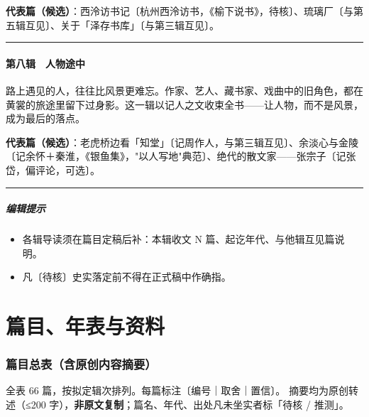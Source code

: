 \documentclass[UTF8,fontset=none,zihao=-4,a4paper]{ctexart}
\begin{document}
\textbf{代表篇（候选）}：西泠访书记〔杭州西泠访书，《榆下说书》，待核〕、琉璃厂〔与第五辑互见〕、关于「泽存书库」〔与第三辑互见〕。


\medskip\hrule\medskip

\subsection{第八辑　人物途中}


路上遇见的人，往往比风景更难忘。作家、艺人、藏书家、戏曲中的旧角色，都在黄裳的旅途里留下过身影。这一辑以记人之文收束全书——让人物，而不是风景，成为最后的落点。


\textbf{代表篇（候选）}：老虎桥边看「知堂」〔记周作人，与第三辑互见〕、余淡心与金陵〔记余怀＋秦淮，《银鱼集》，"以人写地"典范〕、绝代的散文家——张宗子〔记张岱，偏评论，可选〕。


\medskip\hrule\medskip

\subsubsection{编辑提示}

\begin{itemize}
\item 各辑导读须在篇目定稿后补：本辑收文 N 篇、起讫年代、与他辑互见篇说明。
\item 凡〔待核〕史实落定前不得在正式稿中作确指。
\end{itemize}


\part{篇目、年表与资料}

\section{篇目总表（含原创内容摘要）}
\noindent\small 全表 66 篇，按拟定辑次排列。每篇标注〔编号｜取舍｜置信〕。
摘要均为原创转述（≤200 字），\textbf{非原文复制}；篇名、年代、出处凡未坐实者标「待核 / 推测」。\normalsize
\medskip
\end{document}
